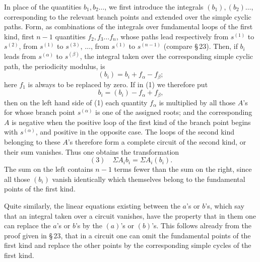 \documentclass[10pt]{article}
\begin{document}
In place of the quantities \(b_1,b_2\ldots\), we first introduce the integrals \((b_1),(b_2)\ldots\), corresponding to the relevant branch points and extended over the simple cyclic paths. Form, as combinations of the integrals over fundamental loops of the first kind, first \(n-1\) quantities \(f_2,f_3\ldots f_n\), whose paths lead respectively from \(s^{(1)}\) to \(s^{(2)}\), from \(s^{(1)}\) to \(s^{(3)}\), \(\ldots\), from \(s^{(1)}\) to \(s^{(n-1)}\) (compare \S\,23). Then, if \(b_i\) leads from \(s^{(\alpha)}\) to \(s^{(\beta)}\), the integral taken over the corresponding simple cyclic path, the periodicity modulus, is
\[
(b_i)=b_i+f_{\alpha}-f_{\beta};
\]
here \(f_1\) is always to be replaced by zero. If in (1) we therefore put
\[
b_i=(b_i)-f_{\alpha}+f_{\beta},
\]
then on the left hand side of (1) each quantity \(f_{\alpha}\) is multiplied by all those \(A\)'s for whose branch point \(s^{(\alpha)}\) is one of the assigned roots; and the corresponding \(A\) is negative when the positive loop of the first kind of the branch point begins with \(s^{(\alpha)}\), and positive in the opposite case. The loops of the second kind belonging to these \(A\)'s therefore form a complete circuit of the second kind, or their sum vanishes. Thus one obtains the transformation
\[
(3)\quad \Sigma A_i b_i=\Sigma A_i(b_i).
\]
The sum on the left contains \(n-1\) terms fewer than the sum on the right, since all those \((b_i)\) vanish identically which themselves belong to the fundamental points of the first kind.

Quite similarly, the linear equations existing between the \(a\)'s or \(b\)'s, which say that an integral taken over a circuit vanishes, have the property that in them one can replace the \(a\)'s or \(b\)'s by the \((a)\)'s or \((b)\)'s. This follows already from the proof given in \S\,23, that in a circuit one can omit the fundamental points of the first kind and replace the other points by the corresponding simple cycles of the first kind.
\end{document}

